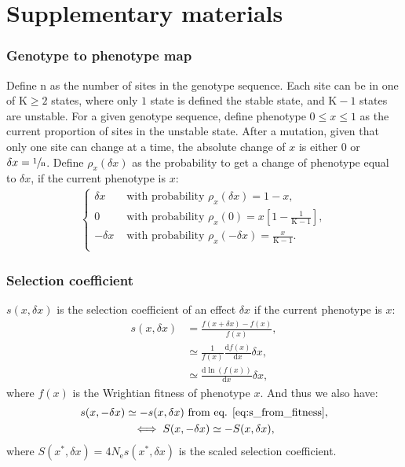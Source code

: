 \documentclass{article}
\newcommand{\der}{\mathrm{d}}
\newcommand{\Ne}{N_{\mathrm{e}}}
\newcommand{\Nsite}{\text{n}}
\newcommand{\Nstate}{\text{K}}
\newcommand{\x}{x}
\newcommand{\eq}{^{*}}
\newcommand{\dx}{\delta \x}
\begin{document}
\part*{Supplementary materials}

\section*{Genotype to phenotype map}
Define $\Nsite$ as the number of sites in the genotype sequence.
Each site can be in one of $\Nstate \geq 2$ states, where only $1$ state is defined the stable state, and $\Nstate - 1$ states are unstable.
For a given genotype sequence, define phenotype $0 \leq \x \leq 1$ as the current proportion of sites in the unstable state.
After a mutation, given that only one site can change at a time, the absolute change of $\x$ is either $0$ or $\dx=\sfrac{1}{\Nsite}$.
Define $\rho_{\x}(\dx)$ as the probability to get a change of phenotype equal to $\dx$, if the current phenotype is $\x$:\\
\begin{gather}
\begin{cases}
\dx &\text{ with probability } \rho_{\x}(\dx) = 1-x, \\
0 &\text{ with probability } \rho_{\x}(0) = \x \left[1 - \frac{1}{\Nstate - 1}\right], \\
-\dx &\text{ with probability } \rho_{\x}(-\dx) = \frac{x}{\Nstate - 1}.\\
\end{cases} \label{eq:proba}
\end{gather}

\section*{Selection coefficient}
$s(\x, \dx)$ is the selection coefficient of an effect $\dx$ if the current phenotype is $\x$:
\begin{align}
s(\x, \dx) &= \frac{f(\x + \dx) - f(\x)}{f( \x)}, \\
 &\simeq \frac{1}{f(\x)}\frac{\der f( \x)}{\der \x} \dx, \\
 &\simeq \frac{\der \ln (f(\x))}{\der \x} \dx, \label{eq:s_from_fitness}
\end{align}
where $f( \x)$ is the Wrightian fitness of phenotype $x$. And thus we also have:
\begin{gather}
s(\x, -\dx) \simeq - s(\x, \dx) \text{ from eq. \ref{eq:s_from_fitness}} \label{eq:s_minus_deltax}, \\
\iff S(\x, -\dx) \simeq - S(\x, \dx), \label{eq:S_minus_deltax}
\end{gather}
where $S(\x\eq, \dx) = 4\Ne s (\x\eq, \dx)$ is the scaled selection coefficient.
\end{document}
